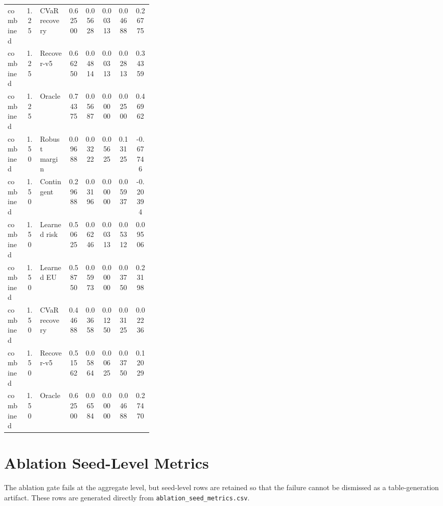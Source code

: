 \documentclass{article}
\begin{document}
\begin{center}
\begin{longtable}{p{0.13\linewidth}cp{0.20\linewidth}ccccc}
combined & 1.25 & CVaR recovery & 0.62500 & 0.05628 & 0.00313 & 0.04688 & 0.26775\\
combined & 1.25 & Recover-v5 & 0.66250 & 0.04814 & 0.00313 & 0.02813 & 0.34359\\
combined & 1.25 & Oracle & 0.74375 & 0.05687 & 0.00000 & 0.02500 & 0.46962\\
combined & 1.50 & Robust margin & 0.09688 & 0.03222 & 0.05625 & 0.13125 & -0.67746\\
combined & 1.50 & Contingent & 0.29688 & 0.03196 & 0.00000 & 0.05937 & -0.20394\\
combined & 1.50 & Learned risk & 0.50625 & 0.06246 & 0.00313 & 0.05312 & 0.09506\\
combined & 1.50 & Learned EU & 0.58750 & 0.05973 & 0.00000 & 0.03750 & 0.23198\\
combined & 1.50 & CVaR recovery & 0.44688 & 0.03658 & 0.01250 & 0.03125 & 0.02236\\
combined & 1.50 & Recover-v5 & 0.51562 & 0.05864 & 0.00625 & 0.03750 & 0.12029\\
combined & 1.50 & Oracle & 0.62500 & 0.06584 & 0.00000 & 0.04688 & 0.27470\\
\bottomrule
\end{longtable}
\normalsize
\end{center}

\section{Ablation Seed-Level Metrics}

The ablation gate fails at the aggregate level, but seed-level rows are retained so that the failure cannot be dismissed as a table-generation artifact. These rows are generated directly from \texttt{ablation\_seed\_metrics.csv}.
\end{document}
